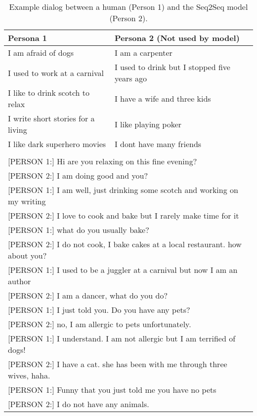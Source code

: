 \begin{table*}[t]
  \begin{center}
    \begin{small}
      \begin{tabular}{l|l}
        \toprule
        \textbf{Persona 1} & \textbf{Persona 2 (Not used by model)}\\
        \midrule
I am afraid of dogs & I am a carpenter \\
I used to work at a carnival & I used to drink but I stopped five years ago\\
I like to drink scotch to relax & I have a wife and three kids\\
I write short stories for a living & I like playing poker\\
I like dark superhero movies & I dont have many friends\\
\bottomrule
\multicolumn{2}{l}{ }\\
\multicolumn{2}{l}{[PERSON 1:] Hi are you relaxing on this fine evening?}\\
\multicolumn{2}{l}{[PERSON 2:] I am doing good and you?}\\
\multicolumn{2}{l}{[PERSON 1:] I am well, just drinking some scotch and working on my writing}\\
\multicolumn{2}{l}{[PERSON 2:] I love to cook and bake but I rarely make time for it} \\
\multicolumn{2}{l}{[PERSON 1:] what do you usually bake?}\\
\multicolumn{2}{l}{[PERSON 2:] I do not cook, I bake cakes at a local restaurant. how about you?}\\
\multicolumn{2}{l}{[PERSON 1:] I used to be a juggler at a carnival but now I am an author}\\
\multicolumn{2}{l}{[PERSON 2:] I am a dancer, what do you do?}\\ 
\multicolumn{2}{l}{[PERSON 1:] I just told you. Do you have any pets?}\\
\multicolumn{2}{l}{[PERSON 2:] no, I am allergic to pets unfortunately.}\\ 
\multicolumn{2}{l}{[PERSON 1:] I understand. I am not allergic but I am terrified of dogs!}\\
\multicolumn{2}{l}{[PERSON 2:] I have a cat. she has been with me through three wives, haha.}\\
\multicolumn{2}{l}{[PERSON 1:] Funny that you just told me you have no pets}\\
\multicolumn{2}{l}{[PERSON 2:] I do not have any animals.}\\
      \end{tabular}
      \caption{Example dialog between a human (Person 1) and the Seq2Seq model (Person 2). 
 \label{table:s2s-example}}
    \end{small}
  \end{center}
\end{table*}


